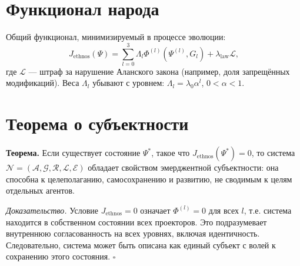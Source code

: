 \documentclass{article}
\begin{document}
\section{Функционал народа}

Общий функционал, минимизируемый в процессе эволюции:
\begin{equation}
J_{\text{ethnos}}(\Psi) = \sum_{l=0}^{3} \Lambda_l \Phi^{(l)}(\Psi^{(l)}, G_l) + \lambda_{\text{law}} \mathcal{L},
\end{equation}
где $\mathcal{L}$ — штраф за нарушение Аланского закона (например, доля запрещённых модификаций). Веса $\Lambda_l$ убывают с уровнем: $\Lambda_l = \lambda_0 \alpha^l$, $0<\alpha<1$.

\section{Теорема о субъектности}

\textbf{Теорема.} Если существует состояние $\Psi^*$, такое что $J_{\text{ethnos}}(\Psi^*) = 0$, то система $\mathcal{N} = (\mathcal{A}, \mathcal{G}, \mathcal{R}, \mathcal{L}, \mathcal{E})$ обладает свойством эмерджентной субъектности: она способна к целеполаганию, самосохранению и развитию, не сводимым к целям отдельных агентов.

\textit{Доказательство.} Условие $J_{\text{ethnos}}=0$ означает $\Phi^{(l)}=0$ для всех $l$, т.е. система находится в собственном состоянии всех проекторов. Это подразумевает внутреннюю согласованность на всех уровнях, включая идентичность. Следовательно, система может быть описана как единый субъект с волей к сохранению этого состояния. \hfill $\square$
\end{document}
